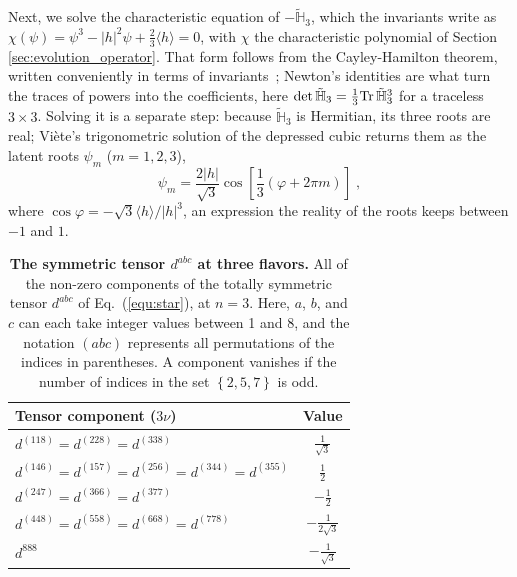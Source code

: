 \documentclass[final,5p,times,twocolumn,sort,compress]{elsarticle}
\newcommand{\eq}{Eq.}
\newcommand{\equ}[1]{\eq~(\ref{equ:#1})}
\begin{document}
Next, we solve the characteristic equation of $-\tilde{\mathbb{H}}_3$, which the invariants write as $\chi\left(\psi\right) = \psi^3 - \left\vert h \right\vert^2 \psi + \frac{2}{3} \langle h \rangle = 0$, with $\chi$ the characteristic polynomial of Section \ref{sec:evolution_operator}.  That form follows from the Cayley-Hamilton theorem, written conveniently in terms of invariants\ \cite{MacFarlane:1968vc, Curtright:2015iba}; Newton's identities are what turn the traces of powers into the coefficients, here $\det \tilde{\mathbb{H}}_3 = \frac{1}{3}{\rm Tr}\,\tilde{\mathbb{H}}_3^3$ for a traceless $3 \times 3$.  Solving it is a separate step: because $\tilde{\mathbb{H}}_3$ is Hermitian, its three roots are real; Vi\`ete's trigonometric solution of the depressed cubic returns them as the latent roots $\psi_m$ ($m=1,2,3$),
\begin{equation}
 \label{equ:psi_m}
 \psi_m
 =
 \frac{2 \left\vert h \right\vert}{\sqrt{3}} \cos\left[\frac{1}{3}\left(\varphi+2\pi m \right)\right] \;,
\end{equation}
where $\cos\varphi = -\sqrt{3} \langle h \rangle / \lvert h \rvert^3$, an expression the reality of the roots keeps between $-1$ and $1$.

{\def\arraystretch{1.2}
\begin{table}[t!]
 \begin{tabular}{lc}
  Tensor component ($3\nu$) & Value \\
  \hline
  $d^{(118)} = d^{(228)} = d^{(338)}$                         & $\frac{1}{\sqrt{3}}$ \\
  $d^{(146)} = d^{(157)} = d^{(256)} = d^{(344)} = d^{(355)}$ & $\frac{1}{2}$ \\
  $d^{(247)} = d^{(366)} = d^{(377)}$                         & $-\frac{1}{2}$ \\
  $d^{(448)} = d^{(558)} = d^{(668)} = d^{(778)}$             & $-\frac{1}{2\sqrt{3}}$ \\
  $d^{888}$                                                   & $-\frac{1}{\sqrt{3}}$
 \end{tabular}
 \caption{\label{tab:d_tensor}{\bf The symmetric tensor $d^{abc}$ at three flavors.} All of the non-zero components of the totally symmetric tensor $d^{abc}$ of \equ{star}, at $n = 3$.  Here, $a$, $b$, and $c$ can each take integer values between 1 and 8, and the notation $\left( abc \right)$ represents all permutations of the indices in parentheses.  A component vanishes if the number of indices in the set $\left\{ 2,5,7 \right\}$ is odd.}
\end{table}
}
\end{document}
